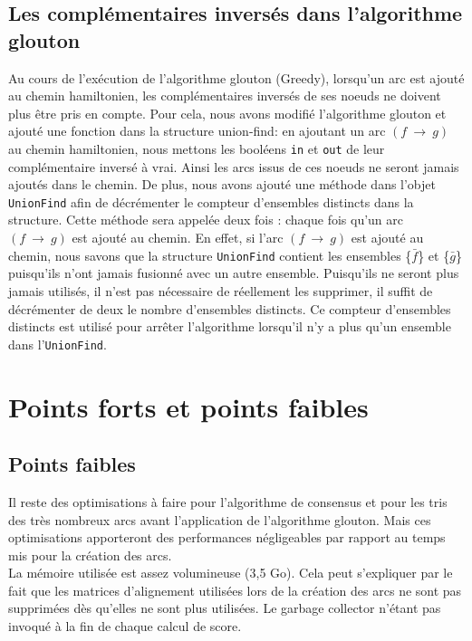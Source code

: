 \documentclass[a4paper, 12pt, titlepage]{article}
\newcommand{\arc}[2]{$(#1~\rightarrow~#2)$}
\begin{document}
\subsection{Les complémentaires inversés dans l'algorithme glouton}%
Au cours de l'exécution de l'algorithme glouton (Greedy), lorsqu'un arc est ajouté au chemin hamiltonien, les complémentaires inversés de ses noeuds ne doivent plus être pris en compte.
Pour cela, nous avons modifié l'algorithme glouton et ajouté une fonction dans la structure union-find:
en ajoutant un arc \arc{f}{g} au chemin hamiltonien, nous mettons les booléens \texttt{in} et \texttt{out} de leur complémentaire inversé à vrai.
Ainsi les arcs issus de ces noeuds ne seront jamais ajoutés dans le chemin.
De plus, nous avons ajouté une méthode dans l'objet \texttt{UnionFind} afin de décrémenter le compteur d'ensembles distincts dans la structure.
Cette méthode sera appelée deux fois : chaque fois qu'un arc \arc{f}{g} est ajouté au chemin.
En effet, si l'arc \arc{f}{g} est ajouté au chemin, nous savons que la structure \texttt{UnionFind} contient les ensembles \{$\bar{f}$\} et \{$\bar{g}$\} puisqu'ils n'ont jamais fusionné avec un autre ensemble.
Puisqu'ils ne seront plus jamais utilisés, il n'est pas nécessaire de
réellement les supprimer, il suffit de décrémenter de deux le nombre d'ensembles distincts.
Ce compteur d'ensembles distincts est utilisé pour arrêter l'algorithme
lorsqu'il n'y a plus qu'un ensemble dans l'\texttt{UnionFind}.





\section{Points forts et points faibles}
\subsection*{Points faibles}
Il reste des optimisations à faire pour l'algorithme de consensus et pour les tris des très nombreux arcs avant l'application de l'algorithme glouton.
Mais ces optimisations apporteront des performances négligeables par rapport au temps mis pour la création des arcs.\\

La mémoire utilisée est assez volumineuse (3,5 Go).
Cela peut s'expliquer par le fait que les matrices d'alignement utilisées lors de la création des arcs ne sont pas supprimées dès qu'elles ne sont plus utilisées.
Le garbage collector n'étant pas invoqué à la fin de chaque calcul de score.
\end{document}
